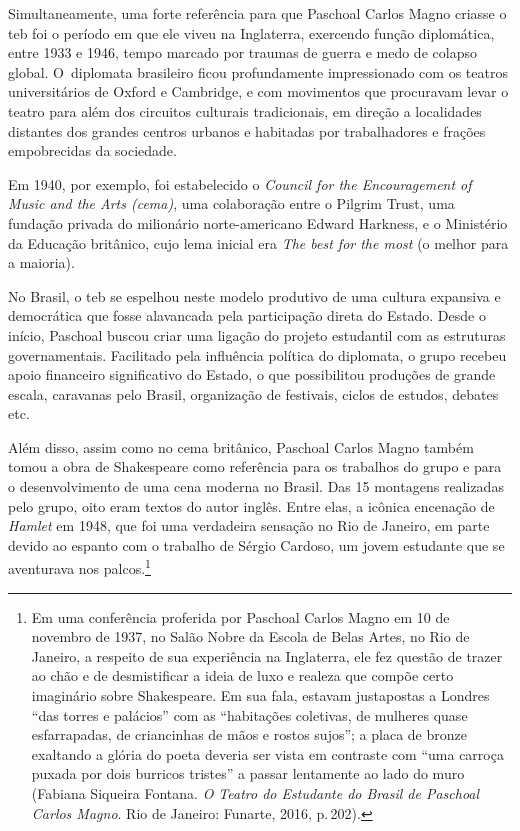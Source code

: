 Simultaneamente, uma forte referência para que Paschoal Carlos Magno
criasse o {\sc teb} foi o período em que ele viveu na Inglaterra, exercendo
função diplomática, entre 1933 e 1946, tempo marcado por traumas de
guerra e medo de colapso global. O~diplomata brasileiro ficou
profundamente impressionado com os teatros universitários de Oxford e
Cambridge, e com movimentos que procuravam levar o teatro para além dos
circuitos culturais tradicionais, em direção a localidades distantes dos
grandes centros urbanos e habitadas por trabalhadores e frações
empobrecidas da sociedade.

Em 1940, por exemplo, foi estabelecido o {\it Council for the
Encouragement of Music and the Arts ({\sc cema})}, uma colaboração entre o
Pilgrim Trust, uma fundação privada do milionário norte-americano Edward
Harkness, e o Ministério da Educação britânico, cujo lema inicial era
{\it The best for the most} (o melhor para a maioria).

No Brasil, o {\sc teb} se espelhou neste modelo produtivo de uma cultura
expansiva e democrática que fosse alavancada pela participação direta do
Estado. Desde o início, Paschoal buscou criar uma ligação do projeto
estudantil com as estruturas governamentais. Facilitado pela influência
política do diplomata, o grupo recebeu apoio financeiro significativo do
Estado, o que possibilitou produções de grande escala, caravanas pelo
Brasil, organização de festivais, ciclos de estudos, debates etc.

Além disso, assim como no {\sc cema} britânico, Paschoal Carlos Magno
também tomou a obra de Shakespeare como referência para os trabalhos do
grupo e para o desenvolvimento de uma cena moderna no Brasil. Das 15
montagens realizadas pelo grupo, oito eram textos do autor inglês. Entre
elas, a icônica encenação de {\it Hamlet} em 1948, que foi uma
verdadeira sensação no Rio de Janeiro, em parte devido ao espanto com o
trabalho de Sérgio Cardoso, um jovem estudante que se aventurava nos
palcos.\footnote{Em uma conferência proferida por Paschoal Carlos Magno
  em 10 de novembro de 1937, no Salão Nobre da Escola de Belas Artes, no
  Rio de Janeiro, a respeito de sua experiência na Inglaterra, ele fez
  questão de trazer ao chão e de desmistificar a ideia de luxo e realeza
  que compõe certo imaginário sobre Shakespeare. Em sua fala, estavam
  justapostas a Londres “das torres e palácios” com as “habitações
  coletivas, de mulheres quase esfarrapadas, de criancinhas de mãos e
  rostos sujos”; a placa de bronze exaltando a glória do poeta deveria
  ser vista em contraste com “uma carroça puxada por dois burricos
  tristes” a passar lentamente ao lado do muro (Fabiana Siqueira Fontana. {\it O Teatro do Estudante do Brasil de Paschoal Carlos Magno}. Rio de Janeiro: Funarte, 2016, p.\,202).}

